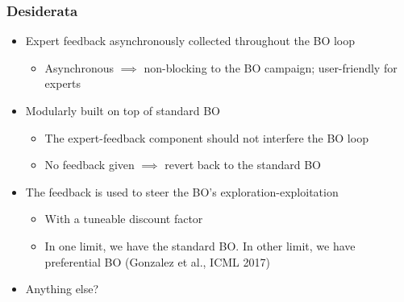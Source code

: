 \documentclass[11pt,usepdftitle=false,aspectratio=169,usenames,dvipsnames,handout]{beamer}
\begin{document}
\begin{frame}
  \frametitle{Desiderata}

  \begin{itemize}
    \item<+-> Expert feedback asynchronously collected throughout the BO loop
    \begin{itemize}
      \item Asynchronous \(\implies\) non-blocking to the BO campaign; user-friendly for experts
    \end{itemize}
    \item<+-> Modularly built on top of standard BO
    \begin{itemize}
      \item The expert-feedback component should not interfere the BO loop
      \item No feedback given \(\implies\) revert back to the standard BO
    \end{itemize}
    \item<+-> The feedback is used to steer the BO's exploration-exploitation
    \begin{itemize}
      \item With a tuneable discount factor
      \item In one limit, we have the standard BO. In other limit, we have preferential BO (Gonzalez et al., ICML 2017)
    \end{itemize}
    \item<+-> Anything else?
  \end{itemize}
\end{frame}
\end{document}
